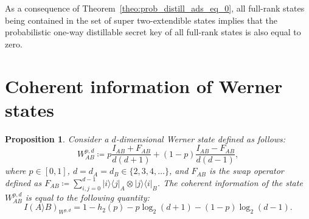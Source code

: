 \documentclass[twocolumn,letterpaper, dvipsnames,allowtoday, accepted = 2025-12-31]{quantumarticle}
\newtheorem{proposition}{Proposition}
\begin{document}
    As a consequence of Theorem~\ref{theo:prob_distill_ads_eq_0}, all full-rank states being contained in the set of super two-extendible states implies that the probabilistic one-way distillable secret key of all full-rank states is also equal to zero. 


    
\section{Coherent information of Werner states}\label{app:coherent_info_Werner}

    \begin{proposition}
        Consider a $d$-dimensional Werner state defined as follows:
        \begin{equation}\label{eq:werner_st_full_defn}
            W^{p,d}_{AB}\coloneqq p\frac{I_{AB} + F_{AB}}{d(d+1)} + (1-p)\frac{I_{AB}-F_{AB}}{d(d-1)},
        \end{equation}
        where $p\in [0,1]$, $d = d_A = d_B \in \{2, 3, 4, \ldots \}$, and $F_{AB}$ is the swap operator defined as $F_{AB} \coloneqq \sum_{i,j=0}^{d-1}|i\rangle\!\langle j|_A\otimes |j\rangle\!\langle i|_B$. The coherent information of the state $W^{p,d}_{AB}$ is equal to the following quantity:
        \begin{equation}\label{eq:coherent_info_werner}
		I\!\left(A\rangle B\right)_{W^{p,d}} = 1 - h_2(p) 
 - p\log_2\!\left({d+1}\right) - (1-p)\log_2\!\left({d-1}\right).
	\end{equation}
    \end{proposition}
\end{document}
